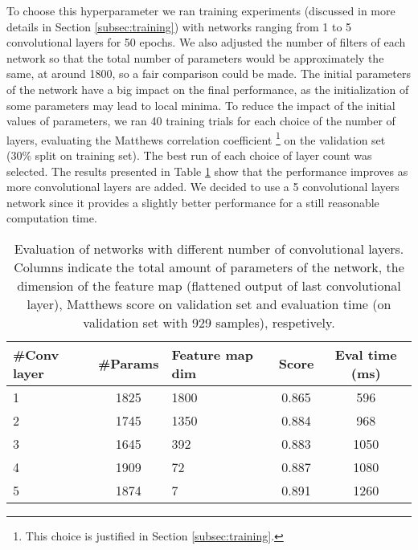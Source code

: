         To choose this hyperparameter we ran training experiments (discussed in more details in Section \ref{subsec:training}) with networks ranging from 1 to 5 convolutional layers for 50 epochs. We also adjusted the number of filters of each network so that the total number of parameters would be approximately the same, at around 1800, so a fair comparison could be made. The initial parameters of the network have a big impact on the final performance, as the initialization of some parameters may lead to local minima. To reduce the impact of the initial values of parameters, we ran 40 training trials for each choice of the number of layers, evaluating the Matthews correlation coefficient \footnote{This choice is justified in Section \ref{subsec:training}.} on the validation set (30\% split on training set). The best run of each choice of layer count was selected. The results presented in Table \ref{table:evalNumberConvLayers} show that the performance improves as more convolutional layers are added. We decided to use a 5 convolutional layers network since it provides a slightly better performance for a still reasonable computation time.

      	\begin{table}
      	 \begin{center}
      	  \caption{Evaluation of networks with different number of convolutional layers. Columns indicate the total amount of parameters of the network, the dimension of the feature map (flattened output of last convolutional layer), Matthews score on validation set and evaluation time (on validation set with 929 samples), respetively.}
      	  \label{table:evalNumberConvLayers}
      	  \begin{tabularx}{\linewidth}{ | X | c | X | c | c |}
      	    \hline
      	    \#Conv layer & \#Params & Feature map dim & Score & Eval time (ms)   \\ \hline
      	    1            & 1825    &  1800           & 0.865 &  596             \\
      	    2            & 1745    &  1350           & 0.884 &  968             \\
      	    3            & 1645    &  392            & 0.883 &  1050            \\
      	    4            & 1909    &  72             & 0.887 &  1080            \\
      	    5            & 1874    &  7              & 0.891 &  1260            \\ \hline
      		  \end{tabularx}
      		\end{center}
      	 \end{table}

